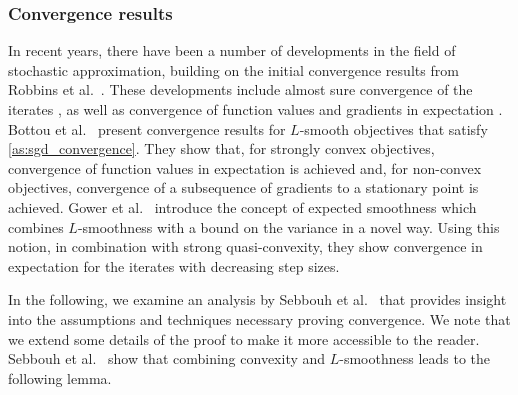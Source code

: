 \documentclass[12pt]{article}
\theoremstyle{definition}
\numberwithin{equation}{section}
\begin{document}
\subsubsection{Convergence results}
\label{sec:convergence_results}
In recent years, there have been a number of developments in the field of stochastic approximation, building on the initial convergence results from Robbins et al.\ \autocite{robbinsStochasticApproximationMethod1951}. These developments include almost sure convergence of the iterates \autocite{zhouStochasticMirrorDescent2017, nguyenSGDHogwildConvergence2018, sebbouhAlmostSureConvergence2021}, as well as convergence of function values and gradients in expectation \autocite{bottouOptimizationMethodsLargeScale2018}.  
Bottou et al.\ \autocite{bottouOptimizationMethodsLargeScale2018} present convergence results for $L$-smooth objectives that satisfy \autoref{as:sgd_convergence}. They show that, for strongly convex objectives, convergence of function values in expectation is achieved and, for non-convex objectives, convergence of a subsequence of gradients to a stationary point is achieved.  
Gower et al.\ \autocite{gowerSGDGeneralAnalysis2019} introduce the concept of expected smoothness which combines $L$-smoothness with a bound on the variance in a novel way. Using this notion, in combination with strong quasi-convexity, they show convergence in expectation for the iterates with decreasing step sizes.

In the following, we examine an analysis by Sebbouh et al.\ \autocite{sebbouhAlmostSureConvergence2021} that provides insight into the assumptions and techniques necessary proving convergence.
We note that we extend some details of the proof to make it more accessible to the reader.
Sebbouh et al.\ \autocite{sebbouhAlmostSureConvergence2021} show that combining convexity and $L$-smoothness leads to the following lemma.
\end{document}
